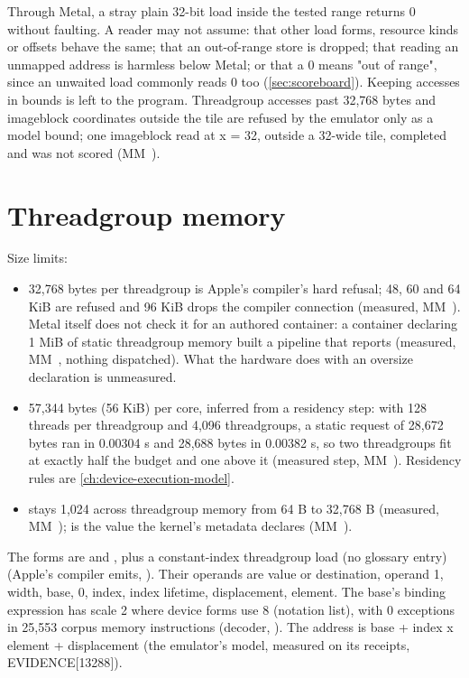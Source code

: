 Through Metal, a stray plain 32-bit load inside the tested range returns 0 without
faulting. A reader may not assume: that other load forms, resource kinds or offsets behave the same; that an
out-of-range store is dropped; that reading an unmapped address is harmless below Metal; or that a 0 means "out of
range", since an unwaited load commonly reads 0 too (\cref{sec:scoreboard}). Keeping accesses in bounds is left to the program. Threadgroup accesses
past 32,768 bytes and imageblock coordinates outside the tile are refused by the emulator only as a model bound; one
imageblock read at x = 32, outside a 32-wide tile, completed and was not scored (MM~).

\section{Threadgroup memory}\label{sec:threadgroup-memory}

Size limits:

\begin{itemize}
\item 32,768 bytes per threadgroup is Apple's compiler's hard refusal; 48, 60 and 64 KiB are refused and 96 KiB drops the
  compiler connection (measured, MM~). Metal itself does not check it for an authored container: a container
  declaring 1 MiB of static threadgroup memory built a pipeline that reports 
  (measured, MM~, nothing dispatched). What the hardware does with an oversize declaration is unmeasured.
\item 57,344 bytes (56 KiB) per core, inferred from a residency step: with 128 threads per threadgroup and 4,096
  threadgroups, a static request of 28,672 bytes ran in 0.00304 s and 28,688 bytes in 0.00382 s, so two threadgroups
  fit at exactly half the budget and one above it (measured step, MM~). Residency rules are \cref{ch:device-execution-model}.
\item {} stays 1,024 across threadgroup memory from 64 B to 32,768 B (measured, MM~);
   is the value the kernel's metadata declares (MM~).
\end{itemize}

The forms are  and , plus a constant-index threadgroup
load  (no glossary entry) (Apple's compiler emits, ). Their operands are value or
destination, operand 1, width, base, 0, index, index lifetime, displacement, element. The base's binding expression
has scale 2 where device forms use 8 (notation list), with 0 exceptions in 25,553 corpus memory instructions
(decoder, ). The address is base + index x element + displacement (the emulator's model,
measured on its receipts,  EVIDENCE{[}13288{]}).

